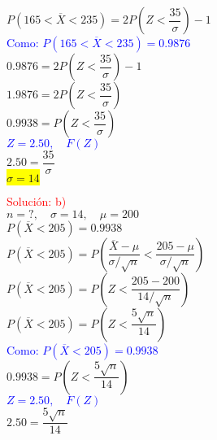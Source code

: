 \documentclass[DIV=calc,paper=a4,fontsize=11pt,openany]{book}
\begin{document}
$\textit{P}(165 < \overline{X} < 235) = 2\textit{P}(\textit{Z} < \dfrac{35}{\sigma}) - 1 $\\

\textcolor{blue}{Como: $\textit{P}(165 < \overline{X} < 235) = 0.9876$}\\

$0.9876 = 2\textit{P}(\textit{Z} < \dfrac{35}{\sigma}) - 1 $\\

$1.9876 = 2\textit{P}(\textit{Z} < \dfrac{35}{\sigma})$\\

$0.9938 = \textit{P}(\textit{Z} < \dfrac{35}{\sigma})$\\

\textcolor{blue}{$\textit{Z} = 2.50,  \quad F(\textit{Z})$}\\

$2.50 = \dfrac{35}{\sigma}$\\

\colorbox{yellow}{$\sigma = 14$}


\textcolor{red}{Solución: b)}\\

$\textit{n} = ?, \quad \sigma = 14 , \quad \mu = 200$\\

$\textit{P}(\overline{X} < 205) = 0.9938$\\

$\textit{P}(\overline{X} < 205) = \textit{P}(\dfrac{\overline{X} - \mu}{\sigma/\sqrt{\textit{n}}} < \dfrac{205 - \mu}{\sigma/\sqrt{\textit{n}}})$\\

$\textit{P}(\overline{X} < 205) = \textit{P}(\textit{Z} < \dfrac{205 - 200}{14/\sqrt{\textit{n}}})$\\

$\textit{P}(\overline{X} < 205) = \textit{P}(\textit{Z} < \dfrac{5\sqrt{\textit{n}}}{14})$\\

\textcolor{blue}{Como: $\textit{P}(\overline{X} < 205) = 0.9938$}\\

$0.9938 = \textit{P}(\textit{Z} < \dfrac{5\sqrt{\textit{n}}}{14})$\\

\textcolor{blue}{$\textit{Z} = 2.50, \quad F(\textit{Z})$}\\

$2.50 = \dfrac{5\sqrt{\textit{n}}}{14}$\\
\end{document}
